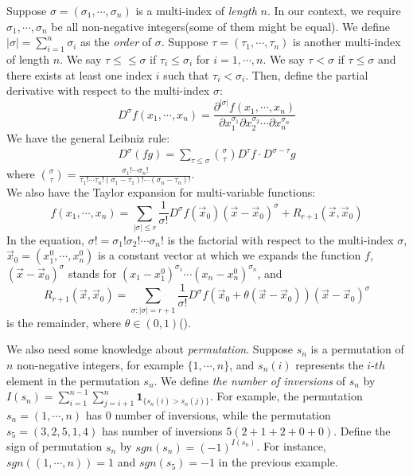 Suppose $\sigma = (\sigma_{1},\cdots,\sigma_{n})$ is a multi-index of \emph{length} $n$. In our context, we require $\sigma_{1},\cdots,\sigma_{n}$ be all non-negative integers(some of them might be equal). We define $|\sigma|=\sum_{i=1}^{n}\sigma_{i}$ as the \emph{order} of $\sigma$. Suppose $\tau=(\tau_{1},\cdots,\tau_{n})$ is another multi-index of length $n$. We say $\tau\leq\leq \sigma$ if $\tau_{i}\leq \sigma_{i}$ for $i=1,\cdots,n$. We say $\tau<\sigma$ if $\tau\leq \sigma$ and there exists at least one index $i$ such that $\tau_{i}<\sigma_{i}$. Then, define the partial derivative with respect to the multi-index $\sigma$:
$$D^{\sigma}f(x_{1},\cdots,x_{n})=\frac{\partial^{|\sigma|}f(x_{1},\cdots,x_{n})}{\partial x_{1}^{\sigma_{1}}\partial x_{2}^{\sigma_{2}}\cdots \partial x_{n}^{\sigma_{n}}}$$ We have the general Leibniz rule:
\begin{align*}
	D^{\sigma}(fg)=\sum_{\tau\leq\sigma}\binom{\sigma}{\tau}D^{\tau}f\cdot D^{\sigma-\tau}g
\end{align*}
where $\binom{\sigma}{\tau}=\frac{\sigma_{1}!\cdots\sigma_{n}!}{\tau_{1}!\cdots\tau_{n}!(\sigma_{1}-\tau_{1})!\cdots(\sigma_{n}-\tau_{n})!}$.\\
We also have the Taylor expansion for multi-variable functions:
$$f(x_{1},\cdots,x_{n})=\sum_{|\sigma|\leq r}\frac{1}{\sigma!}D^{\sigma}f(\vec{x}_{0})(\vec{x}-\vec{x}_{0})^{\sigma}+R_{r+1}(\vec{x},\vec{x}_{0})$$ 
In the equation, $\sigma!=\sigma_{1}!\sigma_{2}!\cdots\sigma_{n}!$ is the factorial with respect to the multi-index $\sigma$, $\vec{x}_{0}=(x_{1}^{0},\cdots,x_{n}^{0})$ is a constant vector at which we expands the function $f$, $(\vec{x}-\vec{x}_{0})^{\sigma}$ stands for $(x_{1}-x_{1}^{0})^{\sigma_{1}}\cdots(x_{n}-x_{n}^{0})^{\sigma_{n}}$, and $$R_{r+1}(\vec{x},\vec{x}_{0})=\sum_{\sigma:|\sigma|=r+1}\frac{1}{\sigma!}D^{\sigma}f(\vec{x}_{0}+\theta(\vec{x}-\vec{x}_{0}))(\vec{x}-\vec{x}_{0})^{\sigma}$$ is the remainder, where $\theta\in (0,1)$(\cite[Theorem 3.18 \& Corollary 3.19]{CJ}).

We also need some knowledge about \emph{permutation}. Suppose $s_{n}$ is a permutation of $n$ non-negative integers, for example $\{1,\cdots,n\}$, and $s_{n}(i)$ represents the $i$-$th$ element in the permutation $s_{n}$. We define \emph{the number of inversions} of $s_{n}$ by $I(s_{n})=\sum_{i=1}^{n-1}\sum_{j=i+1}^{n}\mathbf{1}_{\{s_{n}(i)>s_{n}(j)\}}$. For example, the permutation $s_{n}=(1,\cdots,n)$ has $0$ number of inversions, while the permutation $s_{5}=(3,2,5,1,4)$ has number of inversions $5(2+1+2+0+0)$. Define the sign of permutation $s_{n}$ by $sgn(s_{n})=(-1)^{I(s_{n})}$. For instance, $sgn((1,\cdots,n))=1$ and $sgn(s_{5})=-1$ in the previous example.

